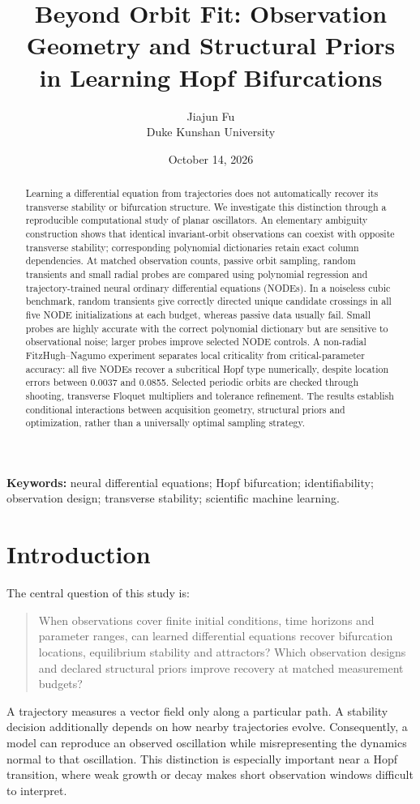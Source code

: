 \documentclass[11pt,a4paper]{article}
\title{\textbf{Beyond Orbit Fit: Observation Geometry and Structural Priors\\in Learning Hopf Bifurcations}}
\author{Jiajun Fu\\Duke Kunshan University}
\date{October 14, 2026}
\begin{document}
\maketitle
\begin{abstract}
Learning a differential equation from trajectories does not automatically recover its transverse stability or bifurcation structure. We investigate this distinction through a reproducible computational study of planar oscillators. An elementary ambiguity construction shows that identical invariant-orbit observations can coexist with opposite transverse stability; corresponding polynomial dictionaries retain exact column dependencies. At matched observation counts, passive orbit sampling, random transients and small radial probes are compared using polynomial regression and trajectory-trained neural ordinary differential equations (NODEs). In a noiseless cubic benchmark, random transients give correctly directed unique candidate crossings in all five NODE initializations at each budget, whereas passive data usually fail. Small probes are highly accurate with the correct polynomial dictionary but are sensitive to observational noise; larger probes improve selected NODE controls. A non-radial FitzHugh--Nagumo experiment separates local criticality from critical-parameter accuracy: all five NODEs recover a subcritical Hopf type numerically, despite location errors between 0.0037 and 0.0855. Selected periodic orbits are checked through shooting, transverse Floquet multipliers and tolerance refinement. The results establish conditional interactions between acquisition geometry, structural priors and optimization, rather than a universally optimal sampling strategy.
\end{abstract}
\noindent\textbf{Keywords:} neural differential equations; Hopf bifurcation; identifiability; observation design; transverse stability; scientific machine learning.

\section{Introduction}
The central question of this study is:
\begin{quote}
When observations cover finite initial conditions, time horizons and parameter ranges, can learned differential equations recover bifurcation locations, equilibrium stability and attractors? Which observation designs and declared structural priors improve recovery at matched measurement budgets?
\end{quote}
A trajectory measures a vector field only along a particular path. A stability decision additionally depends on how nearby trajectories evolve. Consequently, a model can reproduce an observed oscillation while misrepresenting the dynamics normal to that oscillation. This distinction is especially important near a Hopf transition, where weak growth or decay makes short observation windows difficult to interpret.
\end{document}
